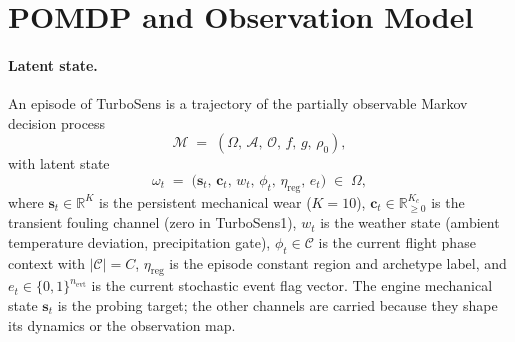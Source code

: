 {
  \hypersetup{linkcolor=black}
  \setcounter{tocdepth}{2}
  \renewcommand{\contentsname}{Appendix Contents}
  \tableofcontents
}
\bigskip


\section{POMDP and Observation Model}
\label{sec:pomdp}

\paragraph{Latent state.}
An episode of TurboSens is a trajectory of the partially observable Markov decision process
\[
    \mathcal{M} \;=\; (\Omega,\,\mathcal{A},\,\mathcal{O},\,f,\,g,\,\rho_0),
\]
with latent state
\[
    \omega_t \;=\; \bigl(\mathbf{s}_t,\, \mathbf{c}_t,\, w_t,\, \phi_t,\, \eta_\mathrm{reg},\, e_t\bigr) \;\in\; \Omega,
\]
where $\mathbf{s}_t \in \mathbb{R}^K$ is the persistent mechanical wear ($K{=}10$), $\mathbf{c}_t \in \mathbb{R}_{\ge 0}^{K_c}$ is the transient fouling channel (zero in TurboSens1), $w_t$ is the weather state (ambient temperature deviation, precipitation gate), $\phi_t \in \mathcal{C}$ is the current flight phase context with $|\mathcal{C}|{=}C$, $\eta_\mathrm{reg}$ is the episode constant region and archetype label, and $e_t \in \{0,1\}^{n_\mathrm{evt}}$ is the current stochastic event flag vector. The engine mechanical state $\mathbf{s}_t$ is the probing target; the other channels are carried because they shape its dynamics or the observation map.

